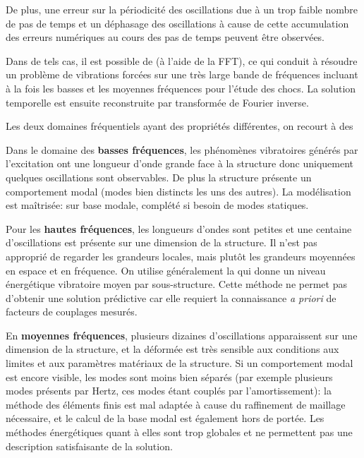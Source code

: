 \medskip
{}
De plus, une erreur sur la périodicité des oscillations due à un trop faible nombre de pas de temps et
un déphasage des oscillations à cause de cette accumulation des erreurs numériques au cours des pas
de temps peuvent être observées.

Dans de tels cas, il est possible de 
(à l'aide de la FFT), ce qui conduit à résoudre un problème de vibrations forcées sur une très large bande
de fréquences incluant à la fois les basses et les moyennes fréquences pour l'étude des chocs.
La solution temporelle est ensuite reconstruite par transformée de Fourier
inverse.

Les deux domaines fréquentiels ayant des propriétés différentes, on recourt à des 

\medskip
Dans le domaine des \textbf{basses fréquences}, les phénomènes vibratoires générés par l'excitation ont une longueur
d'onde grande face à la structure donc uniquement quelques oscillations sont observables. De plus
la structure présente un comportement modal (modes bien distincts les uns des autres).
La modélisation est maîtrisée:  sur base modale, complété si besoin de modes
statiques.

\medskip
Pour les \textbf{hautes fréquences}, les longueurs d'ondes sont petites et une centaine d'oscillations est présente sur une
dimension de la structure. Il n'est pas approprié de regarder les grandeurs locales, mais plutôt les
grandeurs moyennées en espace et en fréquence. On utilise généralement la  
qui donne un niveau énergétique vibratoire moyen par sous-structure. Cette méthode ne permet
pas d'obtenir une solution prédictive car elle requiert la connaissance \emph{a priori} de facteurs de
couplages mesurés.

\medskip
En \textbf{moyennes fréquences}, plusieurs dizaines d'oscillations apparaissent sur une dimension de la structure, et la
déformée est très sensible aux conditions aux limites et aux paramètres matériaux
de la structure. Si un comportement modal est encore visible, les modes sont moins bien
séparés (par exemple plusieurs modes présents par Hertz, ces modes étant couplés
par l'amortissement): la méthode des éléments finis est mal adaptée à cause du raffinement de maillage
nécessaire, et le calcul de la base modal est également hors de portée. Les méthodes
énergétiques quant à elles sont trop globales et ne permettent pas une description satisfaisante
de la solution.

